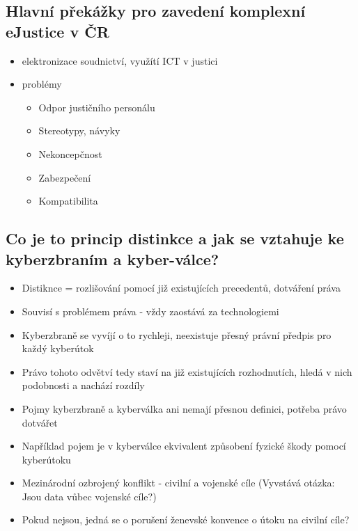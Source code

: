 \subsection{Hlavní překážky pro zavedení komplexní eJustice v ČR}
\begin{itemize}
    \item  elektronizace soudnictví, využítí ICT v justici
    \item problémy
    \begin{itemize}
        \item Odpor justičního personálu
        \item Stereotypy, návyky
        \item Nekoncepčnost
        \item Zabezpečení
        \item Kompatibilita

    \end{itemize}
\end{itemize}

\subsection{Co je to princip distinkce a jak se vztahuje ke kyberzbraním a kyber-válce?}
\begin{itemize}
    \item Distiknce = rozlišování pomocí již existujících precedentů, dotváření práva
    \item Souvisí s problémem práva - vždy zaostává za technologiemi
    \item Kyberzbraně se vyvíjí o to rychleji, neexistuje přesný právní předpis pro každý kyberútok
    \item Právo tohoto odvětví tedy staví na již existujících rozhodnutích, hledá v nich podobnosti a nachází rozdíly
    \item Pojmy kyberzbraně a kyberválka ani nemají přesnou definici, potřeba právo dotvářet
    \item Například pojem  je v kyberválce ekvivalent způsobení fyzické škody pomocí kyberútoku
    \item Mezinárodní ozbrojený konflikt - civilní a vojenské cíle (Vyvstává otázka: Jsou data vůbec vojenské cíle?)
    \item Pokud nejsou, jedná se o porušení ženevské konvence o útoku na civilní cíle?
\end{itemize}